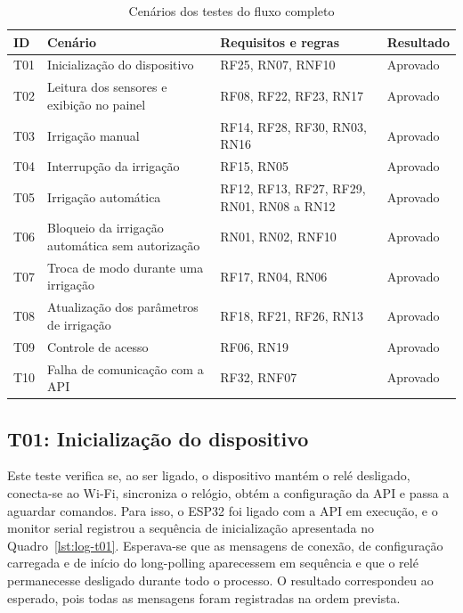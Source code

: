 \begin{table}[htbp]
  \centering
  \caption{Cenários dos testes do fluxo completo}
  \label{tab:cenarios}
  \small
  \renewcommand{\arraystretch}{1.2}
  \begin{tabularx}{\textwidth}{>{\raggedright\arraybackslash}p{0.9cm}
                               >{\raggedright\arraybackslash}X
                               >{\raggedright\arraybackslash}p{3.9cm}
                               >{\raggedright\arraybackslash}p{2.2cm}}
    \hline
    \textbf{ID} & \textbf{Cenário} & \textbf{Requisitos e regras} & \textbf{Resultado} \\
    \hline
    T01 & Inicialização do dispositivo & RF25, RN07, RNF10 & Aprovado \\
    T02 & Leitura dos sensores e exibição no painel & RF08, RF22, RF23, RN17 & Aprovado \\
    T03 & Irrigação manual & RF14, RF28, RF30, RN03, RN16 & Aprovado \\
    T04 & Interrupção da irrigação & RF15, RN05 & Aprovado \\
    T05 & Irrigação automática & RF12, RF13, RF27, RF29, RN01, RN08 a RN12 & Aprovado \\
    T06 & Bloqueio da irrigação automática sem autorização & RN01, RN02, RNF10 & Aprovado \\
    T07 & Troca de modo durante uma irrigação & RF17, RN04, RN06 & Aprovado \\
    T08 & Atualização dos parâmetros de irrigação & RF18, RF21, RF26, RN13 & Aprovado \\
    T09 & Controle de acesso & RF06, RN19 & Aprovado \\
    T10 & Falha de comunicação com a API & RF32, RNF07 & Aprovado \\
    \hline
  \end{tabularx}
\end{table}

\subsection{T01: Inicialização do dispositivo}

Este teste verifica se, ao ser ligado, o dispositivo mantém o relé desligado, conecta-se ao Wi-Fi, sincroniza o relógio, obtém a configuração da API e passa a aguardar comandos. Para isso, o ESP32 foi ligado com a API em execução, e o monitor serial registrou a sequência de inicialização apresentada no Quadro~\ref{lst:log-t01}. Esperava-se que as mensagens de conexão, de configuração carregada e de início do long-polling aparecessem em sequência e que o relé permanecesse desligado durante todo o processo. O resultado correspondeu ao esperado, pois todas as mensagens foram registradas na ordem prevista.

